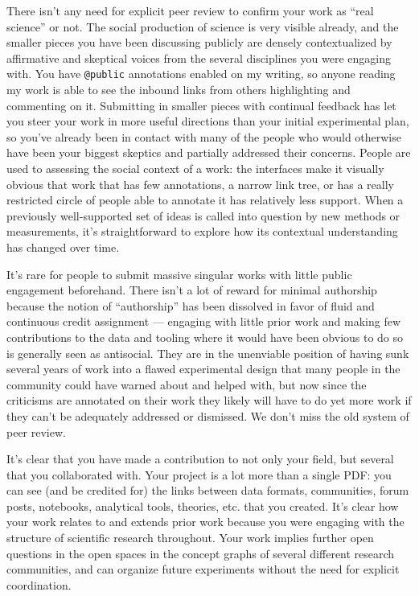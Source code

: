 There isn't any need for explicit peer review to confirm your work as
``real science'' or not. The social production of science is very
visible already, and the smaller pieces you have been discussing
publicly are densely contextualized by affirmative and skeptical voices
from the several disciplines you were engaging with. You have
\texttt{@public} annotations enabled on my writing, so anyone reading my
work is able to see the inbound links from others highlighting and
commenting on it. Submitting in smaller pieces with continual feedback
has let you steer your work in more useful directions than your initial
experimental plan, so you've already been in contact with many of the
people who would otherwise have been your biggest skeptics and partially
addressed their concerns. People are used to assessing the social
context of a work: the interfaces make it visually obvious that work
that has few annotations, a narrow link tree, or has a really restricted
circle of people able to annotate it has relatively less support. When a
previously well-supported set of ideas is called into question by new
methods or measurements, it's straightforward to explore how its
contextual understanding has changed over time.

It's rare for people to submit massive singular works with little public
engagement beforehand. There isn't a lot of reward for minimal
authorship because the notion of ``authorship'' has been dissolved in
favor of fluid and continuous credit assignment --- engaging with little
prior work and making few contributions to the data and tooling where it
would have been obvious to do so is generally seen as antisocial. They
are in the unenviable position of having sunk several years of work into
a flawed experimental design that many people in the community could
have warned about and helped with, but now since the criticisms are
annotated on their work they likely will have to do yet more work if
they can't be adequately addressed or dismissed. We don't miss the old
system of peer review.

It's clear that you have made a contribution to not only your field, but
several that you collaborated with. Your project is a lot more than a
single PDF: you can see (and be credited for) the links between data
formats, communities, forum posts, notebooks, analytical tools,
theories, etc. that you created. It's clear how your work relates to and
extends prior work because you were engaging with the structure of
scientific research throughout. Your work implies further open questions
in the open spaces in the concept graphs of several different research
communities, and can organize future experiments without the need for
explicit coordination.

